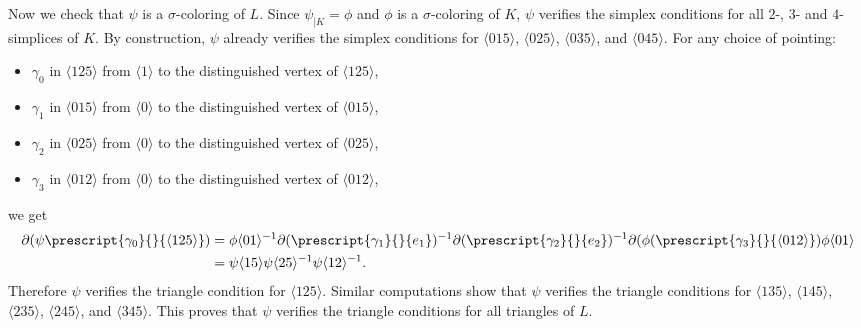 \documentclass[a4paper, oneside]{amsart}
\numberwithin{equation}{subsection}
\theoremstyle{referencedlemma}
\theoremstyle{plain} %
\theoremstyle{remark}
\begin{document}
Now we check that $\psi$ is a $\sigma$-coloring of $L$.  Since $\psi_{\vert K} = \phi$ and $\phi$ is a $\sigma$-coloring of $K$, $\psi$ verifies the simplex conditions for all $2$-, $3$- and $4$-simplices of $K$.  By construction, $\psi$ already verifies the simplex conditions for $\langle 015\rangle$, $\langle 025\rangle$, $\langle 035\rangle$, and $\langle 045\rangle$.  For any choice of pointing:
\begin{itemize}
\item $\gamma_0$ in $\langle 125\rangle$ from $\langle 1\rangle$ to the distinguished vertex of $\langle 125\rangle$,
\item $\gamma_1$ in $\langle 015\rangle $ from $\langle 0\rangle$ to the distinguished vertex of $\langle 015\rangle$,
\item $\gamma_2$ in $\langle 025\rangle$ from $\langle 0\rangle$ to the distinguished vertex of $\langle 025\rangle$, 
\item $\gamma_3$ in $\langle 012\rangle$ from $\langle 0\rangle$ to the distinguished vertex of $\langle 012\rangle$,
\end{itemize}
we get
\begin{align*}
\partial (\psi\prescript{\gamma_0}{}{\langle 125 \rangle}) &= \phi\langle 01\rangle^{-1} \partial(\prescript{\gamma_1}{}{e_1})^{-1}  \partial (\prescript{\gamma_2}{}{e_2})^{-1} \partial (\phi( \prescript{\gamma_3}{}{\langle 012\rangle}) \phi\langle 01\rangle\\
&= \psi\langle 15\rangle \psi\langle 25\rangle^{-1} \psi\langle 12\rangle^{-1}.
\end{align*}
Therefore $\psi$  verifies the triangle condition for $\langle 125\rangle$. Similar computations show that $\psi$ verifies the triangle conditions for $\langle 135\rangle$, $\langle 145\rangle$, $\langle 235\rangle$, $\langle 245\rangle$,  and $\langle 345\rangle$.  This proves that $\psi$ verifies the triangle conditions for all triangles of $L$. 
\end{document}
